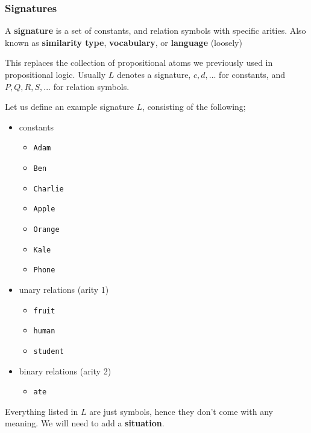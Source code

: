 \documentclass[a4paper, 12pt]{article}
\begin{document}
            \subsubsection*{Signatures}
                A \textbf{signature} is a set of constants, and relation symbols with specific arities. Also known as \textbf{similarity type}, \textbf{vocabulary}, or \textbf{language} (loosely)
                \medskip

                This replaces the collection of propositional atoms we previously used in propositional logic. Usually $L$ denotes a signature, $c, d, ...$ for constants, and $P, Q, R, S, ...$ for relation symbols.
                \medskip

                Let us define an example signature $L$, consisting of the following;
                \begin{itemize}
                    \itemsep0em
                    \item constants
                        \begin{itemize}
                            \itemsep0em
                            \item \texttt{Adam}
                            \item \texttt{Ben}
                            \item \texttt{Charlie}
                            \item \texttt{Apple}
                            \item \texttt{Orange}
                            \item \texttt{Kale}
                            \item \texttt{Phone}
                        \end{itemize}
                    \item unary relations (arity 1)
                        \begin{itemize}
                            \itemsep0em
                            \item \texttt{fruit}
                            \item \texttt{human}
                            \item \texttt{student}
                        \end{itemize}
                    \item binary relations (arity 2)
                        \begin{itemize}
                            \itemsep0em
                            \item \texttt{ate}
                        \end{itemize}
                \end{itemize}
                Everything listed in $L$ are just symbols, hence they don't come with any meaning. We will need to add a \textbf{situation}.
\end{document}
